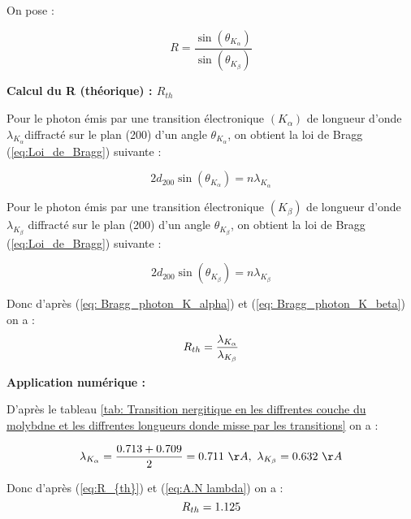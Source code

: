 On pose :

\begin{equation}
	R = \frac{\sin(\theta_{K_{\alpha}})}{\sin(\theta_{K_{\beta}})}
\end{equation}


 \begin{flushleft}
	\textbf{Calcul du R (théorique) : $R_{th}$}
\end{flushleft}


Pour le photon émis par une transition électronique $(K_{\alpha})$ de longueur d'onde $\lambda_{K_{\alpha}}$diffracté sur le plan (200) d'un angle $\theta_{K_{\alpha}}$, on obtient la loi de Bragg (\ref{eq:Loi_de_Bragg}) suivante :

\begin{equation}\label{eq: Bragg_photon_K_alpha}
	2 d_{200}\sin(\theta_{K_{\alpha}}) = n\lambda_{K_{\alpha}}
\end{equation}

Pour le photon émis par une transition électronique $(K_{\beta})$ de longueur d'onde $\lambda_{K_{\beta}}$ diffracté sur le plan (200) d'un angle $\theta_{K_{\beta}}$, on obtient la loi de Bragg (\ref{eq:Loi_de_Bragg}) suivante :

\begin{equation}\label{eq: Bragg_photon_K_beta}
	2 d_{200}\sin(\theta_{K_{\beta}}) = n\lambda_{K_{\beta}}
\end{equation}

Donc d'après (\ref{eq: Bragg_photon_K_alpha}) et (\ref{eq: Bragg_photon_K_beta}) on a :
\begin{equation}\label{eq:R_{th}}
	R_{th} = \frac{\lambda_{K_{\alpha}}}{\lambda_{K_{\beta}}} 
\end{equation}


 \begin{flushleft}
	\textbf{Application numérique :}
\end{flushleft}


D'après le tableau \ref{tab: Transition nergitique en les diffrentes couche du molybdne et les diffrentes longueurs donde misse par les transitions} on a :

\begin{equation}\label{eq:A.N lambda}
	\lambda_{K_{\alpha}} = \frac{0.713 + 0.709}{2} = 0.711 \ \AA, \ \lambda_{K_{\beta}} =0.632 \ \AA
\end{equation}

Donc d'après (\ref{eq:R_{th}}) et (\ref{eq:A.N lambda}) on a :  
\begin{equation}\label{eq:R_{th}_A.N}
	R_{th} = 1.125
\end{equation}

